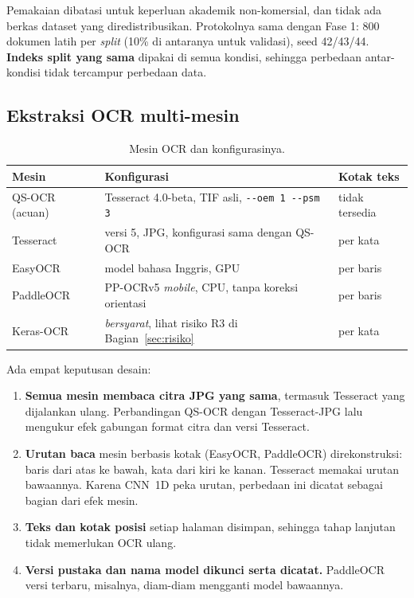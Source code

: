 \documentclass[11pt,a4paper]{article}
\begin{document}
Pemakaian dibatasi untuk keperluan akademik non-komersial, dan tidak ada berkas dataset
yang diredistribusikan. Protokolnya sama dengan Fase 1: 800 dokumen latih per
\textit{split} (10\% di antaranya untuk validasi), seed 42/43/44. \textbf{Indeks split
yang sama} dipakai di semua kondisi, sehingga perbedaan antar-kondisi tidak tercampur
perbedaan data.

\subsection{Ekstraksi OCR multi-mesin}

\begin{table}[H]
\centering\small
\caption{Mesin OCR dan konfigurasinya.}
\begin{tabularx}{\textwidth}{@{}p{2.4cm} L p{2.6cm}@{}}
\toprule
Mesin & Konfigurasi & Kotak teks \\
\midrule
QS-OCR (acuan) & Tesseract 4.0-beta, TIF asli, \texttt{-{}-oem 1 -{}-psm 3} & tidak tersedia \\
Tesseract & versi 5, JPG, konfigurasi sama dengan QS-OCR & per kata \\
EasyOCR & model bahasa Inggris, GPU & per baris \\
PaddleOCR & PP-OCRv5 \textit{mobile}, CPU, tanpa koreksi orientasi & per baris \\
Keras-OCR & \textit{bersyarat}, lihat risiko R3 di Bagian~\ref{sec:risiko} & per kata \\
\bottomrule
\end{tabularx}
\end{table}

Ada empat keputusan desain:
\begin{enumerate}
  \item \textbf{Semua mesin membaca citra JPG yang sama}, termasuk Tesseract yang
  dijalankan ulang. Perbandingan QS-OCR dengan Tesseract-JPG lalu mengukur efek
  gabungan format citra dan versi Tesseract.
  \item \textbf{Urutan baca} mesin berbasis kotak (EasyOCR, PaddleOCR) direkonstruksi:
  baris dari atas ke bawah, kata dari kiri ke kanan. Tesseract memakai urutan
  bawaannya. Karena CNN~1D peka urutan, perbedaan ini dicatat sebagai bagian dari
  efek mesin.
  \item \textbf{Teks dan kotak posisi} setiap halaman disimpan, sehingga tahap lanjutan
  tidak memerlukan OCR ulang.
  \item \textbf{Versi pustaka dan nama model dikunci serta dicatat.} PaddleOCR versi
  terbaru, misalnya, diam-diam mengganti model bawaannya.
\end{enumerate}
\end{document}
